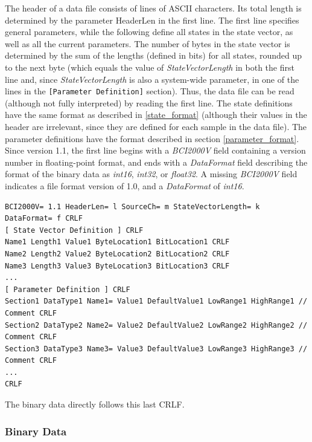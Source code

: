 \documentclass[letterpaper,oneside,12pt]{book}
\begin{document}
The header of a data file consists of lines of ASCII characters. Its total 
length is determined by the parameter HeaderLen in the first line.
The first line specifies general parameters, while the following define all
states in the state vector, as well as all the current parameters.
The number of bytes in the state vector is determined by the sum of the
lengths (defined in bits) for all states, rounded up to the next byte
(which equals the value of \textit{StateVectorLength} in both the first 
line and, since \textit{StateVectorLength} is also a system-wide parameter,
in one of the lines in the \texttt{[Parameter Definition]} section).
Thus, the data file can be read (although not fully interpreted) by reading
the first line.
The state definitions have the same format as described in \ref{state_format}
(although their values in the header are irrelevant, since they are defined
for each sample in the data file).
The parameter definitions have the format described in section
\ref{parameter_format}.
Since version 1.1, the first line begins with a \textit{BCI2000V} field
containing a version number in floating-point format, and ends with a 
\textit{DataFormat} field describing the format of the binary data as
\textit{int16}, \textit{int32}, or \textit{float32}.
A missing \textit{BCI2000V} field indicates a file format version of 1.0, 
and a \textit{DataFormat} of \textit{int16}.

\begin{flushleft}
\begin{footnotesize}
\begin{verbatim}
BCI2000V= 1.1 HeaderLen= l SourceCh= m StateVectorLength= k DataFormat= f CRLF
[ State Vector Definition ] CRLF
Name1 Length1 Value1 ByteLocation1 BitLocation1 CRLF
Name2 Length2 Value2 ByteLocation2 BitLocation2 CRLF
Name3 Length3 Value3 ByteLocation3 BitLocation3 CRLF
...
[ Parameter Definition ] CRLF
Section1 DataType1 Name1= Value1 DefaultValue1 LowRange1 HighRange1 // Comment CRLF
Section2 DataType2 Name2= Value2 DefaultValue2 LowRange2 HighRange2 // Comment CRLF
Section3 DataType3 Name3= Value3 DefaultValue3 LowRange3 HighRange3 // Comment CRLF
...
CRLF
\end{verbatim}
\end{footnotesize}
\end{flushleft}
The binary data directly follows this last CRLF.

\subsubsection{Binary Data}
\label{binary_data}
\end{document}
